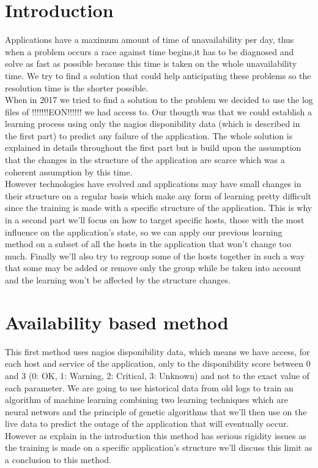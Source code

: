 \documentclass[10pt,a4paper,oneside]{article}
\begin{document}
\begin{multicols}{2}
\section{Introduction}
Applications have a maximum amount of time of unavailability per day, thus when a problem occurs a race against time begins,it has to be diagnosed and solve as fast as possible because this time is taken on the whole unavailability time. We try to find a solution that could help anticipating these problems so the resolution time is the shorter possible.
\\
When in 2017 we tried to find a solution to the problem we decided to use the log files of !!!!!!!EON!!!!!! we had access to. Our thougth was that we could establish a learning process using only the nagios disponibility data (which is described in the first part) to predict any failure of the application. The whole solution is explained in details throughout the first part but is build upon the assumption that the changes in the structure of the application are scarce which was a coherent assumption by this time.
\\ However technologies have evolved and applications may have small changes in their structure on a regular basis which make any form of learning pretty difficult since the training is made with a specific structure of the application. This is why in a second part we'll focus on how to target specific hosts, those with the most influence on the application's state, so we can apply our previous learning method on a subset of all the hosts in the application that won't change too much. Finally we'll also try to regroup some of the hosts together in such a way that some may be added or remove only the group while be taken into account and the learning won't be affected by the structure changes.



\section{Availability based method}
This first method uses nagios disponibility data, which means we have access, for each host and service of the application, only to the disponibility score between 0 and 3 (0: OK, 1: Warning, 2: Critical, 3: Unknown) and not to the exact value of each parameter. We are going to use historical data from old logs to train an algorithm of machine learning combining two learning techniques which are neural networs and the principle of genetic algorithms that we'll then use on the live data to predict the outage of the application that will eventually occur. However as explain in the introduction this method has serious rigidity issues as the training is made on a specific application's structure we'll discuss this limit as a conclusion to this method.

\end{multicols}
\end{document}

